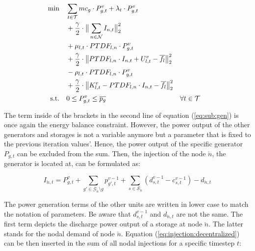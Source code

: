 \begin{subequations}
	\begin{align}
		 \min \quad & \sum_{t\in\mathcal{T}} mc_g \cdot P_{g,t}^v + \lambda_t \cdot P_{g,t}^v \label{eq:sub:gen}\\
		 & + \frac{\gamma}{2} \cdot \big\| \sum_{n \in \mathcal{N}} I_{n,t} \big\|^2_2 \nonumber \\
		 & + \mu_{l,t} \cdot PTDF_{l,n} \cdot P_{g,t}^v \nonumber \\
		 & + \frac{\gamma}{2} \cdot \big\| PTDF_{l,n} \cdot I_{n,t} + U_{l,t}^v - \overline{f_l} \big\|^2_2 \nonumber \\
		 & - \rho_{l,t} \cdot PTDF_{l,n} \cdot P_{g,t}^v \nonumber \\
		 & + \frac{\gamma}{2} \cdot \big\|K_{l,t}^v - PTDF_{l,n} \cdot I_{n,t} - \overline{f_l} \big\|^2_2 \nonumber \\
		 \text{s.t.} \quad & 0 \leq P_{g,t}^v \leq \overline{p_g} && \forall t \in \mathcal{T}
	\end{align}
\end{subequations}

The term inside of the brackets in the second line of equation (\ref{eq:sub:gen}) is once again the energy balance constraint. However, the power output of the other generators and storages is not a variable anymore but a parameter that is fixed to the previous iteration values'. Hence, the power output of the specific generator $P_{g,t}$ can be excluded from the sum. Then, the injection of the node $\breve{n}$, the generator is located at, can be formulated as:
 
 \begin{equation}
	I_{\breve{n},t} = P_{g,t}^v + \sum_{g'\in\mathcal{G}_{\breve{n}} \setminus g}p_{g',t}^{v-1} + \sum_{s\in\mathcal{S}_{\breve{n}}}(d_{s,t}^{v-1}-c_{s,t}^{v-1})-d_{\breve{n},t}
	\label{eq:injection:decentralized}
\end{equation} 
 
 The power generation terms of the other units are written in lower case to match the notation of parameters. Be aware that $d_{s,t}^{v-1}$ and $d_{\breve{n},t}$ are not the same. The first term depicts the discharge power output of a storage at node $\breve{n}$. The latter stands for the nodal demand of node $\breve{n}$. Equation (\ref{eq:injection:decentralized}) can be then inserted in the sum of all nodal injections for a specific timestep $t$:
 
